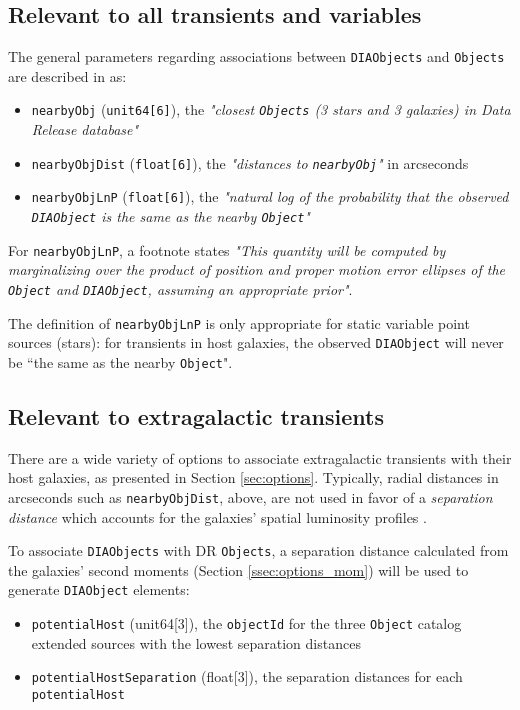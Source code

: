 \documentclass[DM,authoryear,toc]{lsstdoc}
\begin{document}
\subsection{Relevant to all transients and variables}\label{ssec:params_all}

The general parameters regarding associations between {\tt DIAObjects} and {\tt Objects} are described in  as:
\begin{itemize}
\item {\tt nearbyObj} ({\tt unit64[6]}), the {\it "closest {\tt Objects} (3 stars and 3 galaxies) in Data Release database"}
\item {\tt nearbyObjDist} ({\tt float[6]}), the {\it "distances to {\tt nearbyObj}"} in arcseconds
\item {\tt nearbyObjLnP} ({\tt float[6]}), the {\it "natural log of the probability that the observed {\tt DIAObject} is the same as the nearby {\tt Object}"}
\end{itemize}

For {\tt nearbyObjLnP}, a footnote states {\it "This quantity will be computed by marginalizing over the product of position and proper motion error ellipses of the {\tt Object} and {\tt DIAObject}, assuming an appropriate prior"}.

The definition of {\tt nearbyObjLnP} is only appropriate for static variable point sources (stars): for transients in host galaxies, the observed {\tt DIAObject} will never be ``the same as the nearby {\tt Object}".


\subsection{Relevant to extragalactic transients}\label{ssec:params_trans}

There are a wide variety of options to associate extragalactic transients with their host galaxies, as presented in Section \ref{sec:options}. 
Typically, radial distances in arcseconds such as {\tt nearbyObjDist}, above, are not used in favor of a \emph{separation distance} which accounts for the galaxies' spatial luminosity profiles \citep[e.g.,][]{2006ApJ...648..868S}.

To associate {\tt DIAObjects} with DR {\tt Objects}, a separation distance calculated from the galaxies' second moments (Section \ref{ssec:options_mom}) will be used to generate {\tt DIAObject} elements:
\begin{itemize}
\item {\tt potentialHost} (unit64[3]), the {\tt objectId} for the three {\tt Object} catalog extended sources with the lowest separation distances
\item {\tt potentialHostSeparation} (float[3]), the separation distances for each {\tt potentialHost}
\end{itemize}
\end{document}
